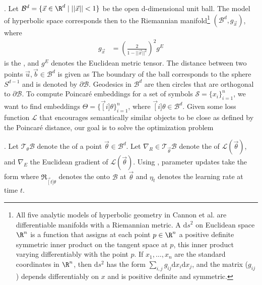 \documentclass[11pt]{article}
\begin{document}
\myspace
\p {}. Let $\mathcal{B}^d = \{\vec x \in \R^d \mid ||\vec x|| < 1\}$ be the open d-dimensional unit ball. The  model of hyperbolic space corresponds then to the Riemannian manifold\footnote{All five analytic models of hyperbolic geometry in Cannon et al. are differentiable manifolds with a Riemannian metric. A  $\mathrm{d}s^2$ on Euclidean space $\R^n$ is a function that assigns at each point $p \in \R^n$ a positive definite symmetric inner product on the tangent space at $p$, this inner product varying differentiably  with the point $p$. If $x_1, \ldots, x_n$ are the standard coordinates in $\R^n$, then $\mathrm{d}s^2$ has the form $\sum_{i,j} g_{ij} \mathrm{d}x_i \mathrm{d}x_j$, and the matrix ($g_{ij}$) depends differentiably on $x$ and is positive definite and symmetric. 
	
} $(\mathcal{B}^d, g_{\vec x})$, where
\begin{align}
g_{\vec x} &= \left( \frac{2}{1 - ||\vec x||^2} \right)^2 g^E
\end{align}
is the , and $g^E$ denotes the Euclidean metric tensor. The distance between two points $\vec u, \vec b \in \mathcal{B}^d$ is given as
The boundary of the ball corresponds to the sphere $S^{d-1}$ and is denoted by $\partial\mathcal{B}$. Geodesics in $\mathcal{B}^d$ are then circles that are orthogonal to $\partial\mathcal{B}$. To compute Poincar\'{e} embeddings for a set of symbols $\mathcal{S} = \{x_i\}_{i=1}^{n}$, we want to find embeddings $\Theta = \{\vec[i]{\theta}\}_{i=1}^{n}$, where $\vec[i]{\theta} \in \mathcal{B}^d$. Given some loss function $\mathcal{L}$ that encourages semantically similar objects to be close as defined by the Poincar\'{e} distance, our goal is to solve the optimization problem

\myspace
\p {}. Let $\mathcal{T}_{\theta}\mathcal{B}$ denote the  of a point $\vec{\theta} \in \mathcal{B}^d$. Let $\nabla_R \in \mathcal{T}_{\vec{\theta}}\mathcal{B}$ denote the  of $\mathcal{L}(\vec{\theta})$, and $\nabla_E$ the Euclidean gradient of $\mathcal{L}(\vec{\theta})$. Using , parameter updates take the form
where $\mathfrak{R}_{\vec[t]{\theta}}$ denotes the  onto $\mathcal{B}$ at $\vec{\theta}$ and $\eta_t$ denotes the learning rate at time $t$. 
\end{document}
